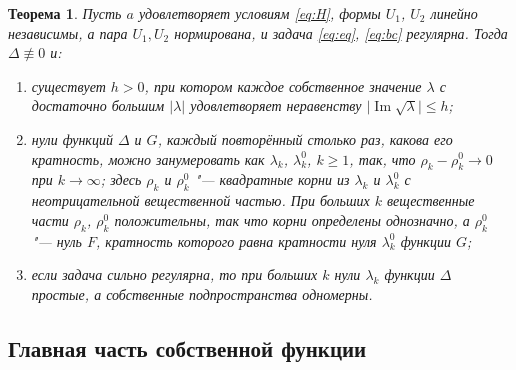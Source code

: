 \documentclass[12pt,a4paper]{article}
\numberwithin{equation}{section}
\newtheorem{theorem}{Теорема}
\theoremstyle{definition}
\newcommand{\abs}[1]{\lvert#1\rvert}
\newcommand{\Imm}{\operatorname{Im}}
\begin{document}
\begin{theorem}\label{thm:eig}
Пусть $a$ удовлетворяет условиям \eqref{eq:H}, формы $U_1$, $U_2$ линейно независимы,
а пара $U_1,U_2$ нормирована, и задача \eqref{eq:eq}, \eqref{eq:bc} регулярна. Тогда $\Delta\not\equiv0$ и:
\begin{enumerate}
\item[(a)] существует $h>0$, при котором каждое собственное значение $\lambda$ с достаточно
 большим $\abs\lambda$ удовлетворяет неравенству $\abs{\Imm\sqrt\lambda}\le h$;
\item[(b)] нули функций $\Delta$ и $G$, каждый повторённый столько раз, какова его кратность,
 можно занумеровать как $\lambda_k$, $\lambda_k^0$, $k\ge1$, так, что
 $\rho_k-\rho_k^0\to0$ при $k\to\infty$; здесь $\rho_k$ и $\rho_k^0$ "--- квадратные корни из
 $\lambda_k$ и $\lambda_k^0$ с неотрицательной вещественной частью. При больших $k$ вещественные
 части $\rho_k$, $\rho_k^0$ положительны, так что корни определены однозначно, а $\rho_k^0$ "---
 нуль $F$, кратность которого равна кратности нуля $\lambda_k^0$ функции $G$;
\item[(c)] если задача сильно регулярна, то при больших $k$ нули $\lambda_k$ функции $\Delta$
 простые, а собственные подпространства одномерны.
\end{enumerate}
\end{theorem}

\subsection{Главная часть собственной функции}\label{ss:ef}
\end{document}
